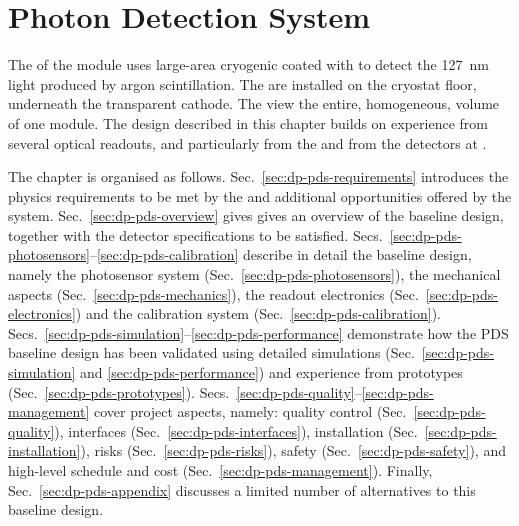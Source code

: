 \chapter{Photon Detection System}
\label{ch:dp-pds}

The  of the \dune \dual module uses large-area cryogenic  coated with  to detect the \SI{127}{\nm} light produced by argon scintillation. The  are installed on the cryostat floor, underneath the  transparent cathode. The   view the entire, homogeneous,  volume of one  module. The design described in this chapter builds on experience from several \lartpc optical readouts, and particularly from the  and from the  detectors at . 

The chapter is organised as follows. Sec.~\ref{sec:dp-pds-requirements} introduces the physics requirements to be met by the  and additional opportunities offered by the system. Sec.~\ref{sec:dp-pds-overview} gives gives an overview of the  baseline design, together with the detector specifications to be satisfied. Secs.~\ref{sec:dp-pds-photosensors}--\ref{sec:dp-pds-calibration} describe in detail the  baseline design, namely the  photosensor system (Sec.~\ref{sec:dp-pds-photosensors}), the mechanical aspects (Sec.~\ref{sec:dp-pds-mechanics}),  the readout electronics (Sec.~\ref{sec:dp-pds-electronics}) and the calibration system (Sec.~\ref{sec:dp-pds-calibration}). Secs.~\ref{sec:dp-pds-simulation}--\ref{sec:dp-pds-performance} demonstrate how the PDS baseline design has been validated using detailed simulations (Sec.~\ref{sec:dp-pds-simulation} and \ref{sec:dp-pds-performance}) and experience from prototypes (Sec.~\ref{sec:dp-pds-prototypes}). Secs.~\ref{sec:dp-pds-quality}--\ref{sec:dp-pds-management} cover  project aspects, namely: quality control (Sec.~\ref{sec:dp-pds-quality}), interfaces (Sec.~\ref{sec:dp-pds-interfaces}), installation (Sec.~\ref{sec:dp-pds-installation}), risks (Sec.~\ref{sec:dp-pds-risks}), safety (Sec.~\ref{sec:dp-pds-safety}), and high-level schedule and cost (Sec.~\ref{sec:dp-pds-management}). Finally, Sec.~\ref{sec:dp-pds-appendix} discusses a limited number of alternatives to this baseline design.  

















